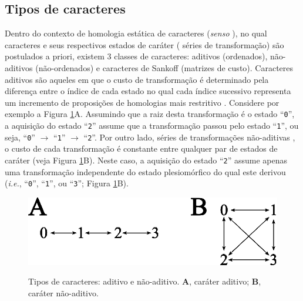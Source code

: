 \newpage
\pagestyle{fancy} %
\begin{refsection}
\renewcommand*{\finalnamedelim}{\addspace\&\space}%

\section{Tipos de caracteres}\label{tut6:chartypes}

Dentro do contexto de homologia estática de caracteres (\textit{senso} \textcite{Wheeler_2001}), no qual caracteres e seus respectivos estados de caráter (\ie{~} séries de transformação) são postulados a priori, existem 3 classes de caracteres: aditivos (ordenados), não-aditivos (não-ordenados) e caracteres de Sankoff (matrizes de custo). Caracteres aditivos \parencite{Farris_1970} são aqueles em que o custo de transformação é determinado pela diferença entre o índice de cada estado no qual cada índice sucessivo representa um incremento de proposições de homologias mais restritivo \parencite{wheeler_2012}. Considere por exemplo a Figura \ref{tut6:fig:chartypes}A. Assumindo que a raiz desta transformação é o estado ``\texttt{0}'', a aquisição do estado ``\texttt{2}'' assume que a transformação passou pelo estado ``\texttt{1}'', ou seja, ``\texttt{0}'' $\rightarrow$ ``\texttt{1}'' $\rightarrow$ ``\texttt{2}''. Por outro lado, séries de transformações não-aditivas \parencite[][]{Fitch_1971}, o custo de cada transformação é constante entre qualquer par de estados de caráter (veja  Figura \ref{tut6:fig:chartypes}B). Neste caso, a aquisição do estado ``\texttt{2}'' assume apenas uma transformação independente do estado plesiomórfico do qual este derivou (\textit{i.e.}, ``\texttt{0}'', ``\texttt{1}'', ou ``\texttt{3}''; Figura \ref{tut6:fig:chartypes}B).\\

  \begin{figure}[H]
       \centering
      {\includegraphics[scale=1.00]{figures/tut6/character_types.eps}}
	{\caption[Tipos de caracteres: aditivo e não-aditivo]{Tipos de caracteres: aditivo e não-aditivo. \textbf{A}, caráter aditivo; \textbf{B}, caráter não-aditivo.}\label{tut6:fig:chartypes}}
  \end{figure}


\end{refsection}
